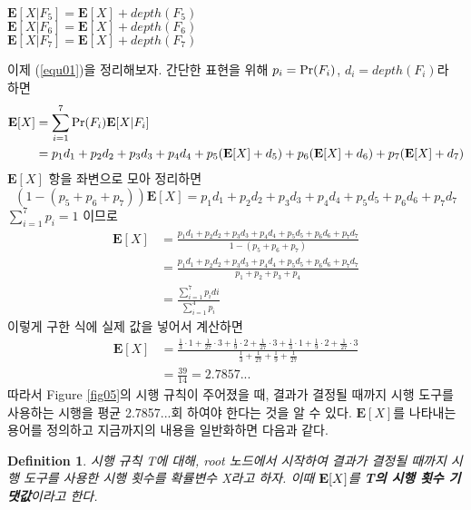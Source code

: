 \documentclass[11pt]{article}
\newtheorem*{definition}{Definition}
\begin{document}
\singlespacing
\begin{center}
$\textbf{E}[X|F_{5}]=\textbf{E}[X]+depth(F_{5})$\\
$\textbf{E}[X|F_{6}]=\textbf{E}[X]+depth(F_{6})$\\
$\textbf{E}[X|F_{7}]=\textbf{E}[X]+depth(F_{7})$\\
\end{center}
\doublespacing

\noindent 이제 (\ref{equ01})을 정리해보자. 간단한 표현을 위해 $p_{i} = \textnormal{Pr}(F_{i})$, $d_{i} = depth(F_{i})$라 하면
\[
\begin{split}
\textbf{E}[X] & = \sum_{i=1}^7 \textnormal{Pr}(F_{i}) \textbf{E}[X|F_{i}]\\
& = p_{1}d_{1} + p_{2}d_{2} + p_{3}d_{3} + p_{4}d_{4} + p_{5}(\textbf{E}[X] + d_{5}) + p_{6}(\textbf{E}[X] + d_{6}) + p_{7}(\textbf{E}[X] + d_{7})
\end{split}
\]
$\textbf{E}[X]$ 항을 좌변으로 모아 정리하면
\[(1 - (p_{5}+p_{6}+p_{7}))\textbf{E}[X] = p_{1}d_{1} + p_{2}d_{2} + p_{3}d_{3} + p_{4}d_{4} + p_{5}d_{5} + p_{6}d_{6} + p_{7}d_{7}\]
\noindent $\displaystyle \sum_{i=1}^7 p_{i} = 1$ 이므로
\[
\begin{split}
\textbf{E}[X] & = \frac{p_{1}d_{1} + p_{2}d_{2} + p_{3}d_{3} + p_{4}d_{4} + p_{5}d_{5} + p_{6}d_{6} + p_{7}d_{7}}{1 - (p_{5}+p_{6}+p_{7})}\\
& = \frac{p_{1}d_{1} + p_{2}d_{2} + p_{3}d_{3} + p_{4}d_{4} + p_{5}d_{5} + p_{6}d_{6} + p_{7}d_{7}}{p_{1}+p_{2}+p_{3}+p_{4}}\\
& = \frac{\displaystyle \sum_{i=1}^{7} p_{i}d{i}}{\displaystyle \sum_{i=1}^{4} p_{i}}
\end{split}
\]
이렇게 구한 식에 실제 값을 넣어서 계산하면
\[
\begin{split}
\textbf{E}[X] & = \frac{\frac{1}{3} \cdot 1 + \frac{1}{27} \cdot 3 + \frac{1}{9} \cdot 2 + \frac{1}{27} \cdot 3 + \frac{1}{3} \cdot 1 + \frac{1}{9} \cdot 2 + \frac{1}{27} \cdot 3}{\frac{1}{3} + \frac{1}{27} + \frac{1}{9} + \frac{1}{27}} \\
& = \frac{39}{14} = 2.7857...
\end{split}
\]
따라서 Figure \ref{fig05}의 시행 규칙이 주어졌을 때, 결과가 결정될 때까지 시행 도구를 사용하는 시행을 평균 2.7857...회 하여야 한다는 것을 알 수 있다. $\textbf{E}[X]$를 나타내는 용어를 정의하고 지금까지의 내용을 일반화하면 다음과 같다.

\singlespacing
\begin{definition}
시행 규칙 T에 대해, root 노드에서 시작하여 결과가 결정될 때까지 시행 도구를 사용한 시행 횟수를 확률변수 X라고 하자. 이때 $\textnormal{\textbf{E}}[X]$를 \textbf{T의 시행 횟수 기댓값}이라고 한다.
\end{definition}
\doublespacing
\end{document}
